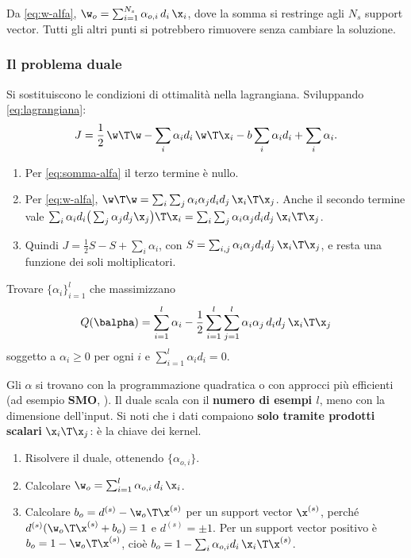 \begin{idea}
Da \eqref{eq:w-alfa}, $\w_o = \sum_{i=1}^{N_s}\alpha_{o,i}\,d_i\,\x_i$, dove la somma si restringe agli $N_s$
support vector. Tutti gli altri punti si potrebbero rimuovere senza cambiare la soluzione.
\end{idea}

\subsubsection{Il problema duale}
Si sostituiscono le condizioni di ottimalità nella lagrangiana. Sviluppando \eqref{eq:lagrangiana}:
\[
J = \frac12\,\w\T\w - \sum_i\alpha_id_i\,\w\T\x_i - b\sum_i\alpha_id_i + \sum_i\alpha_i .
\]
\begin{enumerate}
  \item Per \eqref{eq:somma-alfa} il terzo termine è nullo.
  \item Per \eqref{eq:w-alfa}, $\w\T\w = \sum_i\sum_j\alpha_i\alpha_jd_id_j\,\x_i\T\x_j$. Anche il secondo termine
        vale $\sum_i\alpha_id_i\big(\sum_j\alpha_jd_j\x_j\big)\T\x_i = \sum_i\sum_j\alpha_i\alpha_jd_id_j\,\x_i\T\x_j$.
  \item Quindi $J = \frac12S - S + \sum_i\alpha_i$, con $S = \sum_{i,j}\alpha_i\alpha_jd_id_j\,\x_i\T\x_j$, e resta una
        funzione dei soli moltiplicatori.
\end{enumerate}

\begin{definizione}
Trovare $\{\alpha_i\}_{i=1}^l$ che massimizzano
\[
Q(\balpha) = \sum_{i=1}^{l}\alpha_i - \frac12\sum_{i=1}^{l}\sum_{j=1}^{l}\alpha_i\alpha_j\,d_id_j\,\x_i\T\x_j
\]
soggetto a $\alpha_i\ge0$ per ogni $i$ e $\sum_{i=1}^l\alpha_id_i = 0$.
\end{definizione}

Gli $\alpha$ si trovano con la programmazione quadratica o con approcci più efficienti (ad esempio \textbf{SMO},
). Il duale scala con il \textbf{numero di esempi $l$}, meno con la dimensione
dell'input. Si noti che i dati compaiono \textbf{solo tramite prodotti scalari} $\x_i\T\x_j$: è la chiave dei kernel.

\begin{algoritmo}
\begin{enumerate}
  \item Risolvere il duale, ottenendo $\{\alpha_{o,i}\}$.
  \item Calcolare $\w_o = \sum_{i=1}^l\alpha_{o,i}\,d_i\,\x_i$.
  \item Calcolare $b_o = d^{(s)} - \w_o\T\x^{(s)}$ per un support vector $\x^{(s)}$, perché
        $d^{(s)}(\w_o\T\x^{(s)}+b_o) = 1$ e $d^{(s)}=\pm1$. Per un support vector positivo è $b_o = 1-\w_o\T\x^{(s)}$,
        cioè $b_o = 1-\sum_i\alpha_{o,i}d_i\,\x_i\T\x^{(s)}$.
\end{enumerate}
\end{algoritmo}

